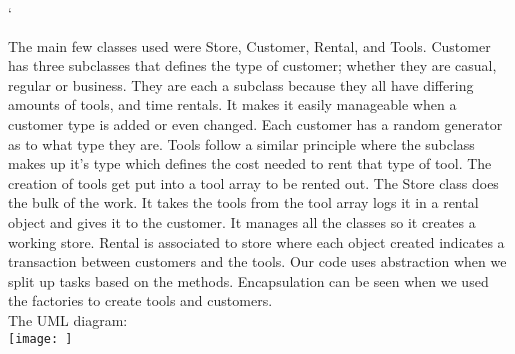 \documentclass[12pt]{article}
\begin{document}
`
\renewcommand{\headrulewidth}{0.4pt}
 
\vspace{-3mm}
 
The main few classes used were Store, Customer, Rental, and Tools. Customer has three subclasses that defines the type of customer; whether they are casual, regular or business. They are each a subclass because they all have differing amounts of tools, and time rentals. It makes it easily manageable when a customer type is added or even changed. Each customer has a random generator as to what type they are. Tools follow a similar principle where the subclass makes up it's type which defines the cost needed to rent that type of tool. The creation of tools get put into a tool array to be rented out. The Store class does the bulk of the work. It takes the tools from the tool array logs it in a rental object and gives it to the customer. It manages all the classes so it creates a working store. Rental is associated to store where each object created indicates a transaction between customers and the tools. Our code uses abstraction when we split up tasks based on the methods. Encapsulation can be seen when we used the factories to create tools and customers. %
\\
The UML diagram:\\
\texttt{[image: ]}
\end{document}
